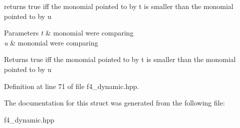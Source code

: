 returns {\ttfamily true} iff the monomial pointed to by {\ttfamily t} is smaller than the monomial pointed to by {\ttfamily u} 


\begin{DoxyParams}{Parameters}
{\em t} & monomial we\textquotesingle{}re comparing \\
\hline
{\em u} & monomial we\textquotesingle{}re comparing \\
\hline
\end{DoxyParams}
\begin{DoxyReturn}{Returns}
{\ttfamily true} iff the monomial pointed to by {\ttfamily t} is smaller than the monomial pointed to by {\ttfamily u} 
\end{DoxyReturn}


Definition at line 71 of file f4\+\_\+dynamic.\+hpp.



The documentation for this struct was generated from the following file\+:\begin{DoxyCompactItemize}
\item 
f4\+\_\+dynamic.\+hpp\end{DoxyCompactItemize}
